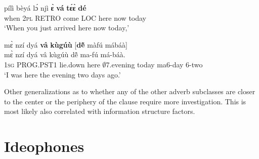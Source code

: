 \begin{exe} 
\ex\label{ADVM1}
  \gll pílì bèyá lɔ́ njì {\bfseries ɛ̀} {\bfseries vá} {\bfseries tɛ́ɛ̀} {\bfseries dé}  \\
         when 2\textsc{pl} RETRO come LOC here now today  \\
    \trans `When you just arrived here now today,'
\end{exe}

\begin{exe} 
\ex\label{ADVM2} 
  \glll  mɛ̀ nzí dyá {\bfseries vâ} {\bfseries kùgúù} [{\bfseries dẽ̂} màfú mábáà] \\
        mɛ̀ nzí dyá vâ kùgúù dẽ̂ ma-fú má-báà. \\
          1\textsc{sg} PROG.PST1 lie.down here $\emptyset$7.evening today ma6-day 6-two  \\
    \trans `I was here the evening two days ago.'
\end{exe}

\noindent Other generalizations as to whether any of the other adverb subclasses are closer to the center or the periphery of the clause require more investigation. This is most likely also correlated with information structure factors.























\section{Ideophones}
\label{sec:IDEO}


